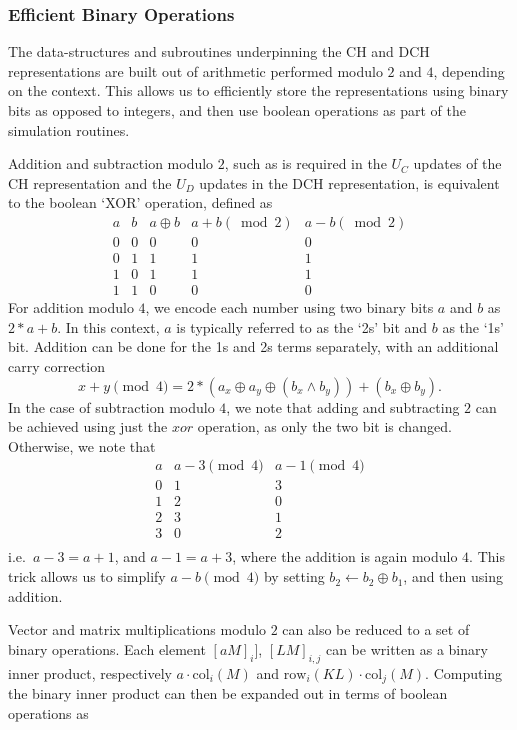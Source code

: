 \subsubsection*{Efficient Binary Operations}\label{sec:binary_ops}
The data-structures and subroutines underpinning the CH and DCH representations are built out of arithmetic performed modulo $2$ and $4$, depending on the context. This allows us to efficiently store the representations using binary bits as opposed to integers, and then use boolean operations as part of the simulation routines.\par
Addition and subtraction modulo $2$, such as is required in the $U_{C}$ updates of the CH representation and the $U_{D}$ updates in the DCH representation, is equivalent to the boolean `XOR' operation, defined as
\[
\begin{array}{c|c|c|c|c}
a & b & a\oplus b & a+b\left(\bmod{2}\right)&a-b\left(\bmod{2}\right)\\
\hline
0 & 0 & 0 & 0 & 0\\
0 & 1 & 1  & 1 & 1\\
1 & 0 & 1 & 1 & 1\\
1 & 1 & 0 & 0 & 0
\end{array}
\label{eq:xor}
\]
For addition modulo $4$, we encode each number using two binary bits $a$ and $b$ as $2*a+b$. In this context, $a$ is typically referred to as the `2s' bit and $b$ as the `1s' bit. Addition can be done for the  1s and 2s terms separately, with an additional carry correction
\[x+y\pmod{4} = 2*\left(a_{x}\oplus a_{y} \oplus (b_{x}\wedge b_{y})\right) + \left(b_{x}\oplus b_{y}\right).\]
In the case of subtraction modulo $4$, we note that adding and subtracting $2$ can be achieved using just the $xor$ operation, as only the two bit is changed. Otherwise, we note that
\[
\begin{array}{c|c|c}
a  & a-3 \pmod{4} & a-1\pmod{4}\\
\hline
0 & 1 & 3 \\
1 & 2 & 0 \\
2 & 3 & 1 \\
3 & 0 & 2 \\
\end{array}
\]
i.e.\ $a-3=a+1$, and $a-1=a+3$, where the addition is again modulo $4$. This trick allows us to simplify $a-b\pmod{4}$ by setting $b_{2}\gets b_{2}\oplus b_{1}$, and then using addition.\par
Vector and matrix multiplications modulo $2$ can also be reduced to a set of binary operations. Each element $[aM]_{i}]$, $[LM]_{i,j}$ can be written as a binary inner product, respectively $a\cdot \text{col}_{i}(M)$ and $\text{row}_{i}(KL)\cdot\text{col}_{j}(M)$. Computing the binary inner product can then be expanded out in terms of boolean operations as
